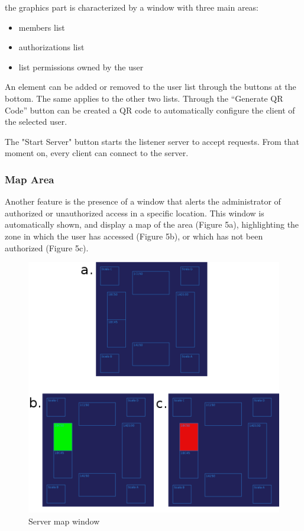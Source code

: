 \documentclass[conference]{IEEEtran}
\begin{document}
the graphics part is characterized by a window with three main areas:

\begin{itemize}
 \item members list
 \item authorizations list
 \item list permissions owned by the user
\end{itemize}

An element can be added or removed to the user list through the buttons at the bottom. The same applies to the other two lists.
Through the “Generate QR Code” button can be created a QR code to automatically configure the client of the selected user.

The "Start Server" button starts the listener server to accept requests. From that moment on, every client can connect to the server.

\subsubsection{Map Area}

Another feature is the presence of a window that alerts the administrator of authorized or unauthorized access in a specific location. This window is automatically shown, and display a map of the area (Figure 5a), highlighting the zone in which the user has accessed (Figure 5b), or which has not been authorized (Figure 5c).

\begin{figure}[h]
\centering
\includegraphics[scale=0.3]{fig5}
\caption{Server map window}
\label{fig_sim}
\end{figure}
\end{document}
